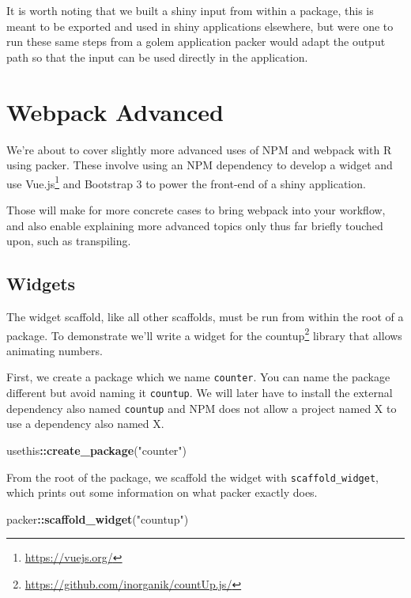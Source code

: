\documentclass[
  10pt,
]{krantz}
\makeatletter
\newenvironment{Shaded}{\begin{snugshade}}{\end{snugshade}}
\newcommand{\KeywordTok}[1]{\textcolor[rgb]{0.27,0.27,0.27}{\textbf{#1}}}
\newcommand{\NormalTok}[1]{#1}
\newcommand{\OperatorTok}[1]{\textcolor[rgb]{0.43,0.43,0.43}{\textbf{#1}}}
\newcommand{\StringTok}[1]{\textcolor[rgb]{0.5,0.5,0.5}{#1}}
\renewcommand{\href}[2]{#2\footnote{\url{#1}}}
\newenvironment{kframe}{%
\medskip{}
\setlength{\fboxsep}{.8em}
 \def\at@end@of@kframe{}%
 \ifinner\ifhmode%
  \def\at@end@of@kframe{\end{minipage}}%
  \begin{minipage}{\columnwidth}%
 \fi\fi%
 \def\FrameCommand##1{\hskip\@totalleftmargin \hskip-\fboxsep
 \colorbox{shadecolor}{##1}\hskip-\fboxsep
     \hskip-\linewidth \hskip-\@totalleftmargin \hskip\columnwidth}%
 \MakeFramed {\advance\hsize-\width
   \@totalleftmargin\z@ \linewidth\hsize
   \@setminipage}}%
 {\par\unskip\endMakeFramed%
 \at@end@of@kframe}
\renewenvironment{Shaded}{\begin{kframe}}{\end{kframe}}
\makeatother
\begin{document}
It is worth noting that we built a shiny input from within a package, this is meant to be exported and used in shiny applications elsewhere, but were one to run these same steps from a golem application packer would adapt the output path so that the input can be used directly in the application.

\hypertarget{packer-adv}{%
\chapter{Webpack Advanced}\label{packer-adv}}

We're about to cover slightly more advanced uses of NPM and webpack with R using packer. These involve using an NPM dependency to develop a widget and use \href{https://vuejs.org/}{Vue.js} and Bootstrap 3 to power the front-end of a shiny application.

Those will make for more concrete cases to bring webpack into your workflow, and also enable explaining more advanced topics only thus far briefly touched upon, such as transpiling.

\hypertarget{packer-adv-widgets}{%
\section{Widgets}\label{packer-adv-widgets}}

The widget scaffold, like all other scaffolds, must be run from within the root of a package. To demonstrate we'll write a widget for the \href{https://github.com/inorganik/countUp.js/}{countup} library that allows animating numbers.

First, we create a package which we name \texttt{counter}. You can name the package different but avoid naming it \texttt{countup}. We will later have to install the external dependency also named \texttt{countup} and NPM does not allow a project named X to use a dependency also named X.

\begin{Shaded}
\begin{Highlighting}[]
\NormalTok{usethis}\OperatorTok{::}\KeywordTok{create\_package}\NormalTok{(}\StringTok{"counter"}\NormalTok{)}
\end{Highlighting}
\end{Shaded}

From the root of the package, we scaffold the widget with \texttt{scaffold\_widget}, which prints out some information on what packer exactly does.

\begin{Shaded}
\begin{Highlighting}[]
\NormalTok{packer}\OperatorTok{::}\KeywordTok{scaffold\_widget}\NormalTok{(}\StringTok{"countup"}\NormalTok{)}
\end{Highlighting}
\end{Shaded}
\end{document}
